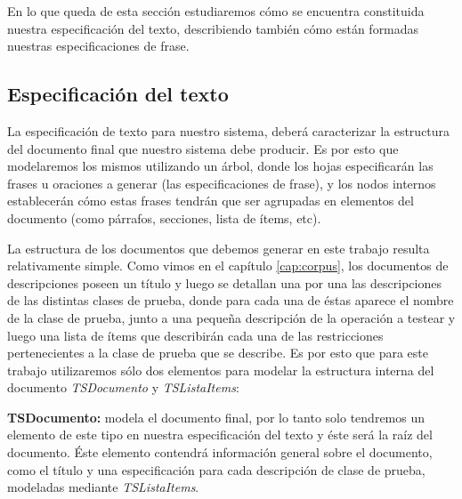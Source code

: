 En lo que queda de esta sección estudiaremos cómo se encuentra constituida nuestra especificación del texto, describiendo también cómo están formadas nuestras especificaciones de frase.

\subsection{Especificación del texto}



La especificación de texto para nuestro sistema, deberá caracterizar la estructura del documento final que nuestro sistema debe producir. Es por esto que modelaremos los mismos utilizando un árbol, donde los hojas especificarán las frases u oraciones a generar (las especificaciones de frase), y los nodos internos establecerán cómo estas frases tendrán que ser agrupadas en elementos del documento (como párrafos, secciones, lista de ítems, etc). 

La estructura de los documentos que debemos generar en este trabajo resulta relativamente simple. Como vimos en el capítulo \ref{cap:corpus}, los documentos de descripciones poseen un título y luego se detallan una por una las descripciones de las distintas clases de prueba, donde para cada una de éstas aparece el nombre de la clase de prueba, junto a una pequeña descripción de la operación a testear y luego una lista de ítems que describirán cada una de las restricciones pertenecientes a la clase de prueba que se describe. Es por esto que para este trabajo utilizaremos sólo dos elementos para modelar la estructura interna del documento \emph{TSDocumento} y \emph{TSListaItems}:

\medskip
\noindent
\textbf{TSDocumento:} modela el documento final, por lo tanto solo tendremos un elemento de este tipo en nuestra especificación del texto y éste será la raíz del documento. Éste elemento contendrá información general sobre el documento, como el título y una especificación para cada descripción de clase de prueba, modeladas mediante \emph{TSListaItems}.

